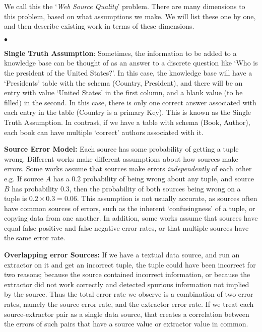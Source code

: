 \documentclass{sig-alternate}
\newcounter{prob}
\newcommand{\squishlist}{
   \begin{list}{$\bullet$}
    { \setlength{\itemsep}{0pt}
      \setlength{\parsep}{2pt}
      \setlength{\topsep}{2pt}
      \setlength{\partopsep}{0pt}
    }
}
\newcommand{\squishend}{\end{list}}
\begin{document}
We call this the `{\em Web Source Quality}' problem. There are many dimensions to this problem, based on what assumptions we make. We will list these one by one, and then describe existing work in terms of these dimensions. 
\squishlist
\item {\bf Single Truth Assumption}: Sometimes, the information to be added to a knowledge base can be thought of as an answer to a discrete question like `Who is the president of the United States?'. In this case, the knowledge base will have a `Presidents' table with the schema (Country, President), and there will be an entry with value `United States' in the first column, and a blank value (to be filled) in the second. In this case, there is only one correct answer associated with each entry in the table (Country is a primary Key). This is known as the Single Truth Assumption. In contrast, if we have a table with schema (Book, Author), each book can have multiple `correct' authors associated with it. 
\item {\bf Source Error Model:} Each source has some probability of getting a tuple wrong. Different works make different assumptions about how sources make errors. Some works assume that sources make errors {\em independently} of each other e.g. If source $A$ has a $0.2$ probability of being wrong about any tuple, and source $B$ has probability $0.3$, then the probability of both sources being wrong on a tuple is $0.2 \times 0.3 = 0.06$. This assumption is not usually accurate, as sources often have common sources of errors, such as the inherent `confusingness' of a tuple, or copying data from one another. In addition, some works assume that sources have equal false positive and false negative error rates, or that multiple sources have the same error rate. 
\item {\bf Overlapping error Sources:} If we have a textual data source, and run an extractor on it and get an incorrect tuple, the tuple could have been incorrect for two reasons; because the source contained incorrect information, or because the extractor did not work correctly and detected spurious information not implied by the source. Thus the total error rate we observe is a combination of two error rates, namely the source error rate, and the extractor error rate. If we treat each source-extractor pair as a single data source, that creates a correlation between the errors of such pairs that have a source value or extractor value in common. 
\squishend
\end{document}
